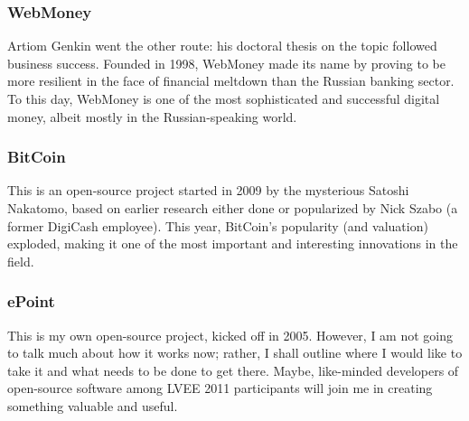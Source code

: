 \documentclass[10pt, a5paper]{article}
\begin{document}
\subsubsection*{WebMoney}
Artiom Genkin went the other route: his doctoral thesis on the topic
followed business success. Founded in 1998, WebMoney made its name by
proving to be more resilient in the face of financial meltdown than the
Russian banking sector. To this day, WebMoney is one of the most
sophisticated and successful digital money, albeit mostly in the
Russian-speaking world.

\subsubsection*{BitCoin}
This is an open-source project started in 2009 by the mysterious Satoshi
Nakatomo, based on earlier research either done or popularized by Nick
Szabo (a former DigiCash employee). This year, BitCoin's popularity (and
valuation) exploded, making it one of the most im\-portant and interesting
innovations in the field.

\subsubsection*{ePoint}
This is my own open-source project, kicked off in 2005. However, I am
not going to talk much about how it works now; rather, I shall outline
where I would like to take it and what needs to be done to get there.
Maybe, like-minded developers of open-source software among LVEE 2011
participants will join me in creating something valuable and useful.
\end{document}
